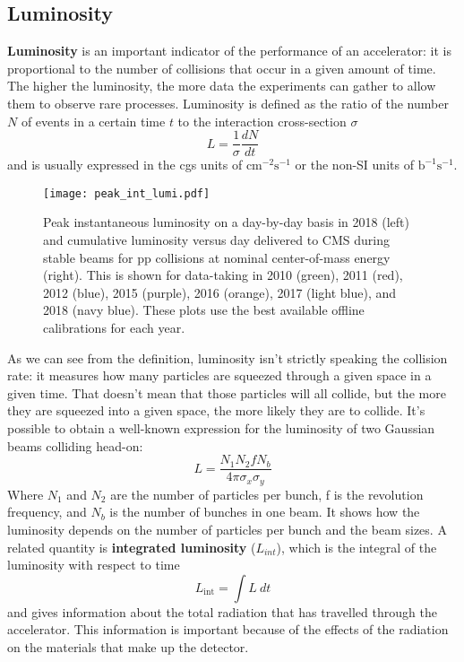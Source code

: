 \documentclass[12pt,twoside,a4paper]{report}
\numberwithin{equation}{section}
\begin{document}
\subsection{Luminosity}
\textbf{Luminosity} is an important indicator of the performance of an accelerator: it is proportional to the number of collisions that occur in a given amount of time. The higher the luminosity, the more data the experiments can gather to allow them to observe rare processes.
Luminosity is defined as the ratio of the number $N$ of events in a certain time $t$ to the interaction cross-section $\sigma$
\begin{equation}
L = \frac{1}{\sigma}\frac{dN}{dt}
\end{equation}
and is usually expressed in the cgs units of $ \mathrm{cm}^{-2}\mathrm{s}^{-1} $ or the non-SI units of $\mathrm{b}^{-1}\mathrm{s}^{-1}$.
\begin{figure}[!htb]
\begin{center}
\texttt{[image: peak\_int\_lumi.pdf]}
\caption{\label{fig:peak_int_lumi} Peak instantaneous luminosity on a day-by-day basis in 2018 (left) and cumulative luminosity versus day delivered to CMS during stable beams for pp collisions at nominal center-of-mass energy (right). This is shown for data-taking in 2010 (green), 2011 (red), 2012 (blue), 2015 (purple), 2016 (orange), 2017 (light blue), and 2018 (navy blue). These plots use the best available offline calibrations for each year. \cite{lumi_results}}
\end{center}
\end{figure}
As we can see from the definition, luminosity isn’t strictly speaking the collision rate: it measures how many particles are squeezed through a given space in a given time. That doesn’t mean that those particles will all collide, but the more they are squeezed into a given space, the more likely they are to collide.
It's possible to obtain a well-known expression for the luminosity of two Gaussian beams colliding head-on:
\begin{equation}
L = \frac{N_{1}N_{2}fN_{b}}{4\pi\sigma_{x}\sigma_{y}}
\end{equation}
Where $N_{1}$ and $N_{2}$ are the number of particles per bunch, f is the revolution frequency, and $N_{b}$ is the number of bunches in one beam.
It shows how the luminosity depends on the number of particles per bunch and the beam sizes.
A related quantity is \textbf{integrated luminosity} ($L_{int}$), which is the integral of the luminosity with respect to time
\begin{equation}
L_\mathrm{int} = \int L \ dt
\end{equation}
and gives information about the total radiation that has travelled through the accelerator. This information is important because of the effects of the radiation on the materials that make up the detector.
\end{document}
